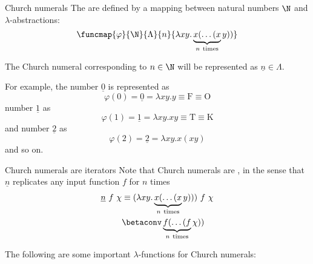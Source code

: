 \documentclass[a4paper, 12pt]{report}
\begin{document}
    \begin{frameddefn}{Church numerals}
        The  are defined by a mapping between natural numbers $\N$ and $\lambda$-abstractions: $$\funcmap{\varphi}{\N}{\Lambda}{n}{\lambda xy. \underbrace{x ( \ldots ( x}_{n \ \mathrm{times}}y))}$$
    \end{frameddefn}

    The Church numeral corresponding to $n \in \N$ will be represented as $\underline n \in \Lambda$.

    \begin{example}
        For example, the number $\underline 0$ is represented as $$\varphi(0) = \underline 0 = \lambda xy. y \equiv \mathrm F \equiv \mathrm O$$ number $\underline 1$ as $$\varphi(1) = \underline 1 = \lambda xy.xy \equiv \mathrm T \equiv \mathrm K$$ and number $\underline 2$ as $$\varphi(2) = \underline 2 = \lambda xy.x(xy)$$ and so on.
    \end{example}

    \begin{framedobs}[label={church_iterators}]{Church numerals are iterators}
        Note that Church numerals are , in the sense that $\underline n$ replicates any input function $f$ for $n$ times
        \begin{equation*}
            \begin{split}
                \underline n \ f \ \chi &\equiv (\lambda xy.\underbrace{x(\ldots(x}_{n \ \mathrm{times}}y))) \ f \ \chi \\
                                        &\betaconv \underbrace{f(\ldots(f}_{n \ \mathrm{times}}\chi))
            \end{split}
        \end{equation*}
    \end{framedobs}

    The following are some important $\lambda$-functions for Church numerals:
    
\end{document}
